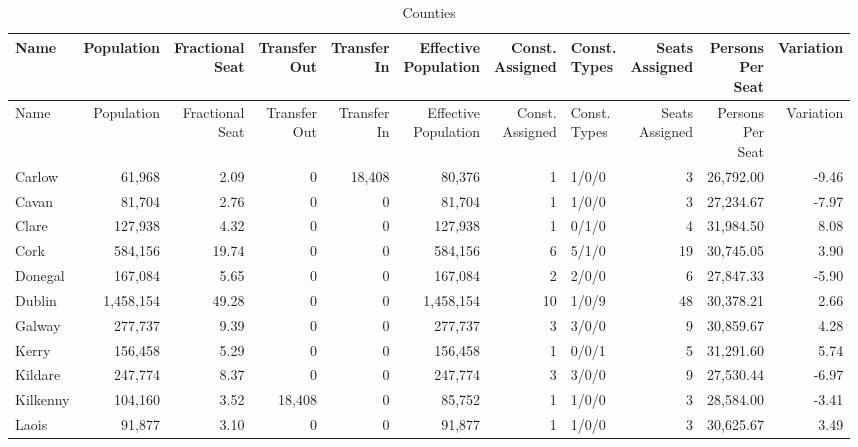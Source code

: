 \documentclass[a4paper]{article}
\begin{document}
\begin{longtable}{lrrrrrrlrrr}
\caption{Counties}
\\ \toprule
Name &Population &\shortstack{Fractional\\Seat} &\shortstack{Transfer\\Out} &\shortstack{Transfer\\In} &\shortstack{Effective\\Population} &\shortstack{Const.\\Assigned} &\shortstack{Const.\\Types} &\shortstack{Seats\\Assigned} &\shortstack{Persons\\Per\\Seat} &Variation \\ \midrule
\endfirsthead
\toprule
Name &Population &\shortstack{Fractional\\Seat} &\shortstack{Transfer\\Out} &\shortstack{Transfer\\In} &\shortstack{Effective\\Population} &\shortstack{Const.\\Assigned} &\shortstack{Const.\\Types} &\shortstack{Seats\\Assigned} &\shortstack{Persons\\Per\\Seat} &Variation \\ \midrule
\endhead
\bottomrule
\endfoot
Carlow&61,968& 2.09&0&18,408&80,376&1&1/0/0&3&26,792.00&-9.46\\ 
Cavan&81,704& 2.76&0&0&81,704&1&1/0/0&3&27,234.67&-7.97\\ 
Clare&127,938& 4.32&0&0&127,938&1&0/1/0&4&31,984.50& 8.08\\ 
Cork&584,156&19.74&0&0&584,156&6&5/1/0&19&30,745.05& 3.90\\ 
Donegal&167,084& 5.65&0&0&167,084&2&2/0/0&6&27,847.33&-5.90\\ 
Dublin&1,458,154&49.28&0&0&1,458,154&10&1/0/9&48&30,378.21& 2.66\\ 
Galway&277,737& 9.39&0&0&277,737&3&3/0/0&9&30,859.67& 4.28\\ 
Kerry&156,458& 5.29&0&0&156,458&1&0/0/1&5&31,291.60& 5.74\\ 
Kildare&247,774& 8.37&0&0&247,774&3&3/0/0&9&27,530.44&-6.97\\ 
Kilkenny&104,160& 3.52&18,408&0&85,752&1&1/0/0&3&28,584.00&-3.41\\ 
Laois&91,877& 3.10&0&0&91,877&1&1/0/0&3&30,625.67& 3.49\\ 

\end{longtable}
\end{document}
